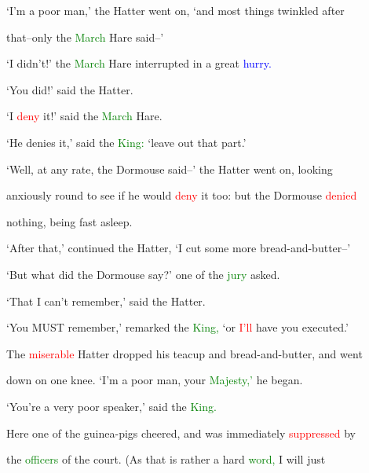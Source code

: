  ‘I’m a poor man,’ the Hatter went on, ‘and most things \textcolor{BurntOrange}{twinkled} after

 that--only the \textcolor{green}{March} Hare said--’



 ‘I didn’t!’ the \textcolor{green}{March} Hare \textcolor{BurntOrange}{interrupted} in a great \textcolor{blue}{hurry.}



 ‘You did!’ said the Hatter.



 ‘I \textcolor{red}{deny} it!’ said the \textcolor{green}{March} Hare.



 ‘He denies it,’ said the \textcolor{green}{King:} \textcolor{BurntOrange}{‘leave} out that part.’



 ‘Well, at any rate, the Dormouse said--’ the Hatter went on, looking

 anxiously round to see if he would \textcolor{red}{deny} it too: but the Dormouse \textcolor{red}{denied}

 nothing, being fast asleep.



 ‘After that,’ continued the Hatter, ‘I cut some more bread-and-butter--’



 ‘But what did the Dormouse say?’ one of the \textcolor{green}{jury} asked.



 ‘That I can’t remember,’ said the Hatter.



 ‘You MUST remember,’ remarked the \textcolor{green}{King,} ‘or \textcolor{red}{I’ll} have you executed.’



 The \textcolor{red}{miserable} Hatter dropped his teacup and bread-and-butter, and went

 down on one knee. ‘I’m a poor man, your \textcolor{green}{Majesty,’} he began.



 ‘You’re a very poor speaker,’ said the \textcolor{green}{King.}



 Here one of the guinea-pigs \textcolor{BurntOrange}{cheered,} and was \textcolor{BurntOrange}{immediately} \textcolor{red}{suppressed} by

 the \textcolor{green}{officers} of the \textcolor{BurntOrange}{court.} (As that is rather a hard \textcolor{green}{word,} I will just

